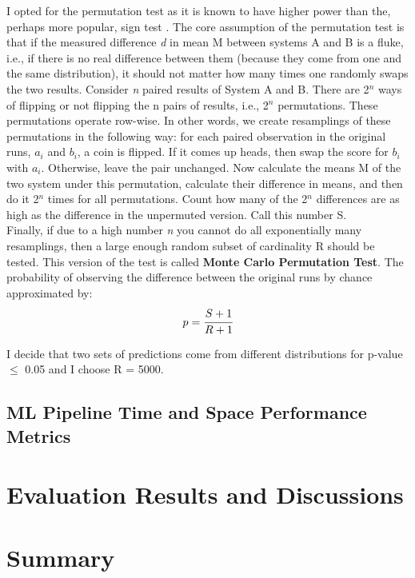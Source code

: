     I opted for the permutation test as it is known to have higher power than the, perhaps more popular, sign test \cite{signtest}. The core assumption of the permutation test is that if the measured difference \textit{d} in mean M between systems A and B is a fluke, i.e., if there is no real difference between them (because they come from one and the same distribution), it should not matter how many times one randomly swaps the two results. Consider \textit{n} paired results of System A and B. There are 2$^n$ ways of flipping or not flipping the n pairs of results, i.e., 2$^n$ permutations. These permutations operate row-wise. In other words, we create resamplings of these permutations in the following way: for each paired observation in the original runs, $a_i$ and $b_i$, a coin is flipped. If it comes up heads, then swap the score for $b_i$ with $a_i$. Otherwise, leave the pair unchanged. Now calculate the means M of the two system under this permutation, calculate their difference in means, and then do it 2$^n$ times for all permutations. Count how many of the 2$^n$ differences are as high as the difference in the unpermuted version. Call this number S. \\
    
    Finally, if due to a high number \textit{n} you cannot do all exponentially many resamplings, then a large enough random subset of cardinality R should be tested. This version of the test is called \textbf{Monte Carlo Permutation Test}. The probability of observing the difference between the original runs by chance approximated by: \\
    
    \begin{equation}
        p = \cfrac{S + 1}{R + 1}
    \end{equation}

    \smallskip
    
    I decide that two sets of predictions come from different distributions for p-value $\leq$ 0.05 and I choose R = 5000.
    
    \subsection{ML Pipeline Time and Space Performance Metrics}
    
    \section{Evaluation Results and Discussions}
    
    \section{Summary}
    
